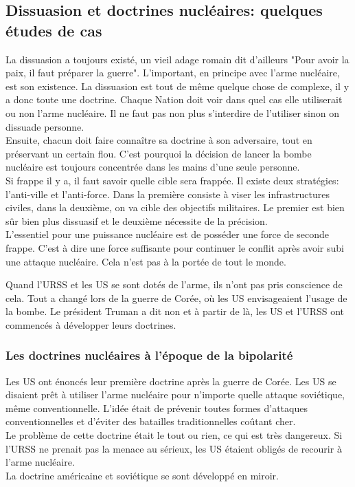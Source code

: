 \documentclass[10pt, a4paper, openany]{book}
\begin{document}
\subsection{Dissuasion et doctrines nucléaires: quelques études de cas}

La dissuasion a toujours existé, un vieil adage romain dit d'ailleurs "Pour avoir la paix, il faut préparer la guerre". L'important, en principe avec l'arme nucléaire, est son existence. La dissuasion est tout de même quelque chose de complexe, il y a donc toute une doctrine. Chaque Nation doit voir dans quel cas elle utiliserait ou non l'arme nucléaire. Il ne faut pas non plus s'interdire de l'utiliser sinon on dissuade personne. \\
Ensuite, chacun doit faire connaître sa doctrine à son adversaire, tout en préservant un certain flou. C'est pourquoi la décision de lancer la bombe nucléaire est toujours concentrée dans les mains d'une seule personne. \\
Si frappe il y a, il faut savoir quelle cible sera frappée. Il existe deux stratégies: l'anti-ville et l'anti-force. Dans la première consiste à viser les infrastructures civiles, dans la deuxième, on va cible des objectifs militaires. Le premier est bien sûr bien plus dissuasif et le deuxième nécessite de la précision. \\
L'essentiel pour une puissance nucléaire est de posséder une force de seconde frappe. C'est à dire une force suffisante pour continuer le conflit après avoir subi une attaque nucléaire. Cela n'est pas à la portée de tout le monde. 


Quand l'URSS et les US se sont dotés de l'arme, ils n'ont pas pris conscience de cela. Tout a changé lors de la guerre de Corée, où les US envisageaient l'usage de la bombe. Le président Truman a dit non et à partir de là, les US et l'URSS ont commencés à développer leurs doctrines.

\subsubsection{Les doctrines nucléaires à l'époque de la bipolarité}

Les US ont énoncés leur première doctrine après la guerre de Corée. Les US se disaient prêt à utiliser l'arme nucléaire pour n'importe quelle attaque soviétique, même conventionnelle. L'idée était de prévenir toutes formes d'attaques conventionnelles et d'éviter des batailles traditionnelles coûtant cher. \\
Le problème de cette doctrine était le tout ou rien, ce qui est très dangereux. Si l'URSS ne prenait pas la menace au sérieux, les US étaient obligés de recourir à l'arme nucléaire. \\
La doctrine américaine et soviétique se sont développé en miroir. 
\end{document}
